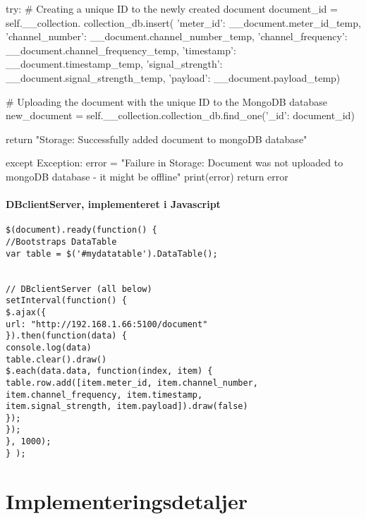 \begin{appendices}
\begin{python}
	try:
	# Creating a unique ID to the newly created document
	document_id = self.__collection.
	collection_db.insert(
	{'meter_id': __document.meter_id_temp,
		'channel_number': __document.channel_number_temp,
		'channel_frequency': __document.channel_frequency_temp,
		'timestamp': __document.timestamp_temp,
		'signal_strength': __document.signal_strength_temp,
		'payload': __document.payload_temp})
	
	# Uploading the document with the unique ID to the MongoDB database
	new_document = self.__collection.collection_db.find_one({'_id': document_id})
	
	return "Storage: Successfully added document to mongoDB database"
	
	except Exception:
	error = "Failure in Storage: Document was not uploaded to mongoDB database - it might be offline"
	print(error)
	return error
	
\end{python}

\pagebreak

\subsubsection{DBclientServer, implementeret i Javascript}
\begin{lstlisting}
$(document).ready(function() {
//Bootstraps DataTable
var table = $('#mydatatable').DataTable();


// DBclientServer (all below)
setInterval(function() {	
$.ajax({
url: "http://192.168.1.66:5100/document"
}).then(function(data) {
console.log(data)
table.clear().draw()
$.each(data.data, function(index, item) {
table.row.add([item.meter_id, item.channel_number, 
item.channel_frequency, item.timestamp, 
item.signal_strength, item.payload]).draw(false)
});
});
}, 1000);
} );

\end{lstlisting}

\pagebreak

\chapter{Implementeringsdetaljer} \label{appendix::implementeringsdetaljer}


\end{appendices}
